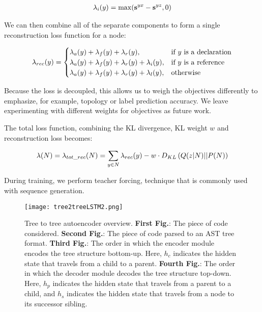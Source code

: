 \begin{align}
    \lambda_i(y)=\max(\mathbf{s}^{yx} - \mathbf{s}^{yz},0)
\end{align}

\noindent We can then combine all of the separate components to form a single reconstruction loss function for a node:

\begin{small}
\begin{align}
   \lambda_{rec}(y) = 
\begin{cases}
    \lambda_{a}(y) + \lambda_{f}(y) + \lambda_{r}(y),& \text{if } y \text{ is a declaration} \\
    \lambda_{a}(y) + \lambda_{f}(y) + \lambda_{r}(y) + \lambda_{i}(y),& \text{if } y \text{ is a reference} \\
    \lambda_{a}(y) + \lambda_{f}(y) + \lambda_{r}(y) + \lambda_{l}(y),& \text{otherwise}
\end{cases}
\end{align}
\end{small}

Because the loss is decoupled, this allows us to weigh the objectives differently to emphasize, for example, topology or label prediction accuracy. We leave experimenting with different weights for objectives as future work. 

The total loss function, combining the KL divergence, KL weight $w$ and reconstruction loss becomes:

\begin{align}
    \lambda(N) = \lambda_{tot\_rec}(N) = \sum_{y \in N}\lambda_{rec}(y) - w \cdot D_{KL}\left(Q(z|N)||P(N)\right)
\end{align}

During training, we perform teacher forcing, technique that is commonly used with sequence generation.

\begin{figure}[ht!]
    \centering
    \texttt{[image: tree2treeLSTM2.png]}
    \caption[Tree2Tree model high-level overview]{Tree to tree autoencoder overview. \textbf{First Fig.}: The piece of code considered. \textbf{Second Fig.}: The piece of code parsed to an AST tree format. \textbf{Third Fig.}: The order in which the encoder module encodes the tree structure bottom-up. Here, $h_c$ indicates the hidden state that travels from a child to a parent. \textbf{Fourth Fig.}: The order in which the decoder module decodes the tree structure top-down. Here, $h_p$ indicates the hidden state that travels from a parent to a child, and $h_s$ indicates the hidden state that travels from a node to its successor sibling.}
    \label{fig:tree2treeVAE}
\end{figure}

